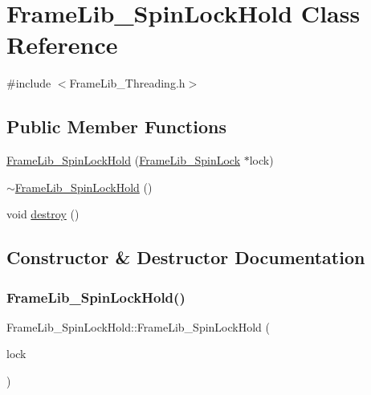 \hypertarget{class_frame_lib___spin_lock_hold}{}\section{Frame\+Lib\+\_\+\+Spin\+Lock\+Hold Class Reference}
\label{class_frame_lib___spin_lock_hold}


{\ttfamily \#include $<$Frame\+Lib\+\_\+\+Threading.\+h$>$}

\subsection*{Public Member Functions}
\begin{DoxyCompactItemize}
\item 
\hyperlink{class_frame_lib___spin_lock_hold_a74b3e01778937f97f6bbffdec5717b88}{Frame\+Lib\+\_\+\+Spin\+Lock\+Hold} (\hyperlink{class_frame_lib___spin_lock}{Frame\+Lib\+\_\+\+Spin\+Lock} $\ast$lock)
\item 
\hyperlink{class_frame_lib___spin_lock_hold_af83ca9fe6b02e885647704fe14f22dcd}{$\sim$\+Frame\+Lib\+\_\+\+Spin\+Lock\+Hold} ()
\item 
void \hyperlink{class_frame_lib___spin_lock_hold_abd57303fe0f7809fe2dac486689ec337}{destroy} ()
\end{DoxyCompactItemize}


\subsection{Constructor \& Destructor Documentation}
\mbox{\label{class_frame_lib___spin_lock_hold_a74b3e01778937f97f6bbffdec5717b88}} 
\subsubsection{\texorpdfstring{Frame\+Lib\+\_\+\+Spin\+Lock\+Hold()}{FrameLib\_SpinLockHold()}}
{\footnotesize\ttfamily Frame\+Lib\+\_\+\+Spin\+Lock\+Hold\+::\+Frame\+Lib\+\_\+\+Spin\+Lock\+Hold (\begin{DoxyParamCaption}\item[{\hyperlink{class_frame_lib___spin_lock}{Frame\+Lib\+\_\+\+Spin\+Lock} $\ast$}]{lock }\end{DoxyParamCaption})\hspace{0.3cm}{\ttfamily [inline]}}

